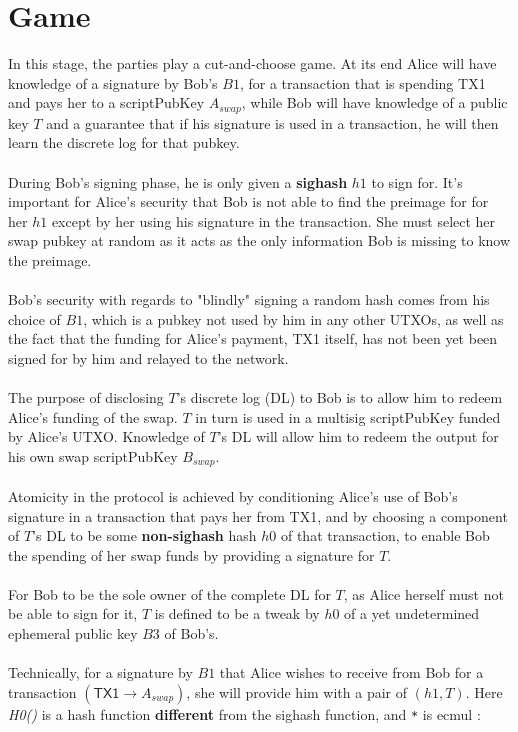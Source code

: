 \documentclass[12pt,a4paper]{article}
\begin{document}
\section{Game}
In this stage, the parties play a cut-and-choose game.  At its end Alice will have knowledge of a signature by Bob's $B1$, for a transaction that is spending \textsf{TX1} and pays her to a scriptPubKey $A_{swap}$, while Bob will have knowledge of a public key $T$ and a guarantee that if his signature is used in a transaction, he will then learn the discrete log for that pubkey. \\ \\
During Bob's signing phase, he is only given a \textbf{sighash} $h1$ to sign for.  It's important for Alice's security that Bob is not able to find the preimage for for her $h1$ except by her using his signature in the transaction.  She must select her swap pubkey at random as it acts as the only information Bob is missing to know the preimage. \\ \\
Bob's security with regards to "blindly" signing a random hash comes from his choice of $B1$, which is a pubkey not used by him in any other UTXOs, as well as the fact that the funding for Alice's payment, \textsf{TX1} itself, has not been yet been signed for by him and relayed to the network.
\\ \\
The purpose of disclosing $T$'s discrete log (DL) to Bob is to allow him to redeem Alice's funding of the swap.  $T$ in turn is used in a multisig scriptPubKey funded by Alice's UTXO.  Knowledge of $T$'s DL will allow him to redeem the output for his own swap scriptPubKey $B_{swap}$. \\ \\
Atomicity in the protocol is achieved by conditioning Alice's use of Bob's signature in a transaction that pays her from \textsf{TX1}, and by choosing a component of $T$'s DL to be some \textbf{non-sighash} hash $h0$ of that transaction, to enable Bob the spending of her swap funds by providing a signature for $T$. \\ \\
For Bob to be the sole owner of the complete DL for $T$, as Alice herself must not be able to sign for it, $T$ is defined to be a tweak by $h0$ of a yet undetermined ephemeral public key $B3$ of Bob's. \\  \\
Technically, for a signature by $B1$ that Alice wishes to receive from Bob for a transaction $(\textsf{TX1} \rightarrow A_{swap})$, she will provide him with a pair of $(h1, T)$.  Here \emph{H0()} is a hash function \textbf{different} from the sighash function, and \texttt{*} is ecmul :
\end{document}
